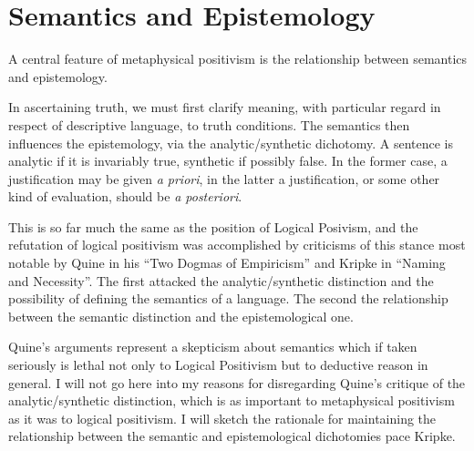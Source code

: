\section{Semantics and Epistemology}

A central feature of metaphysical positivism is the relationship
between semantics and epistemology.

In ascertaining truth, we must first clarify meaning, with particular
regard in respect of descriptive language, to truth conditions.
The semantics then influences the epistemology, via the
analytic/synthetic dichotomy.
A sentence is analytic if it is invariably true, synthetic if possibly
false.
In the former case, a justification may be given \emph{a priori}, in
the latter a justification, or some other kind of evaluation, should
be \emph{a posteriori}.

This is so far much the same as the position of Logical Posivism, and
the refutation of logical positivism was accomplished by criticisms of
this stance most notable by Quine in his ``Two Dogmas of
Empiricism''\cite{quine53} and Kripke in ``Naming and Necessity''.
The first attacked the analytic/synthetic distinction and the
possibility of defining the semantics of a language.
The second the relationship between the semantic distinction and the
epistemological one.

Quine's arguments represent a skepticism about semantics which if
taken seriously is lethal not only to Logical Positivism but to
deductive reason in general.
I will not go here into my reasons for disregarding Quine's critique
of the analytic/synthetic distinction, which is as important to
metaphysical positivism as it was to logical positivism.
I will sketch the rationale for maintaining the relationship between
the semantic and epistemological dichotomies pace Kripke.





